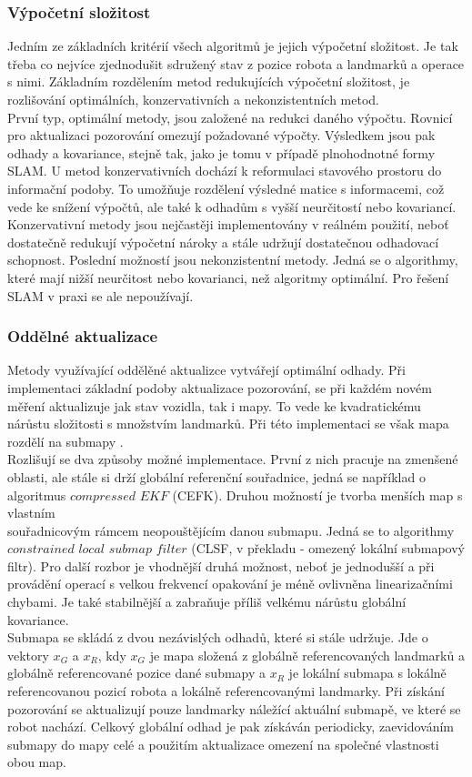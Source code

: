 \documentclass[12pt]{report}
\begin{document}
\subsubsection{Výpočetní složitost}
Jedním ze základních kritérií všech algoritmů je jejich výpočetní složitost. Je tak třeba co nejvíce zjednodušit sdružený stav z pozice robota a landmarků a operace s nimi. Základním rozdělením metod redukujících výpočetní složitost, je rozlišování optimálních, konzervativních a nekonzistentních metod.\\ 
\indent První typ, optimální metody, jsou založené na redukci daného výpočtu. Rovnicí pro aktualizaci pozorování omezují požadované výpočty. Výsledkem jsou pak odhady a kovariance, stejně tak, jako je tomu v případě plnohodnotné formy SLAM. U metod konzervativních dochází k reformulaci stavového prostoru do informační podoby. To umožňuje rozdělení výsledné matice s informacemi, což vede ke snížení výpočtů, ale také k odhadům s vyšší neurčitostí nebo kovariancí. Konzervativní metody jsou nejčastěji implementovány v reálném použití, neboť dostatečně redukují výpočetní nároky a stále udržují dostatečnou odhadovací schopnost. Poslední možností jsou nekonzistentní metody. Jedná se o algorithmy, které mají nižší neurčitost nebo kovarianci, než algoritmy optimální. Pro řešení SLAM v praxi se ale nepoužívají.

\subsubsection{Oddělné aktualizace}
Metody využívající oddělěné aktualizce vytvářejí optimální odhady. Při implementaci základní podoby aktualizace pozorování, se při každém novém měření aktualizuje jak stav vozidla, tak i mapy. To vede ke kvadratickému nárůstu složitosti s množstvím landmarků. Při této implementaci se však mapa rozdělí na submapy \cite{Bailey2006a}.\\
\indent Rozlišují se dva způsoby možné implementace. První z nich pracuje na zmenšené oblasti, ale stále si drží globální referenční souřadnice, jedná se například o algoritmus $compressed$ $EKF$ (CEFK). Druhou možností je tvorba menších map s vlastním\\ souřadnicovým rámcem neopouštějícím danou submapu. Jedná se to algorithmy $constrained$ $local$ $submap$ $filter$ (CLSF, v překladu - omezený lokální submapový filtr). Pro další rozbor je vhodnější druhá možnost, neboť je jednodušší a při provádění operací s velkou frekvencí opakování je méně ovlivněna linearizačními chybami. Je také stabilnější a zabraňuje příliš velkému nárůstu globální kovariance. \\
\indent Submapa se skládá z dvou nezávislých odhadů, které si stále udržuje. Jde o vektory $x_G$ a $x_R$, kdy $x_G$ je mapa složená z globálně referencovaných landmarků a globálně referencované pozice dané submapy a $x_R$ je lokální submapa s lokálně referencovanou pozicí robota a lokálně referencovanými landmarky. Při získání pozorování se aktualizují pouze landmarky náležící aktuální submapě, ve které se robot nachází. Celkový globální odhad je pak získáván periodicky, zaevidováním submapy do mapy celé a použitím aktualizace omezení na společné vlastnosti obou map.
\end{document}

